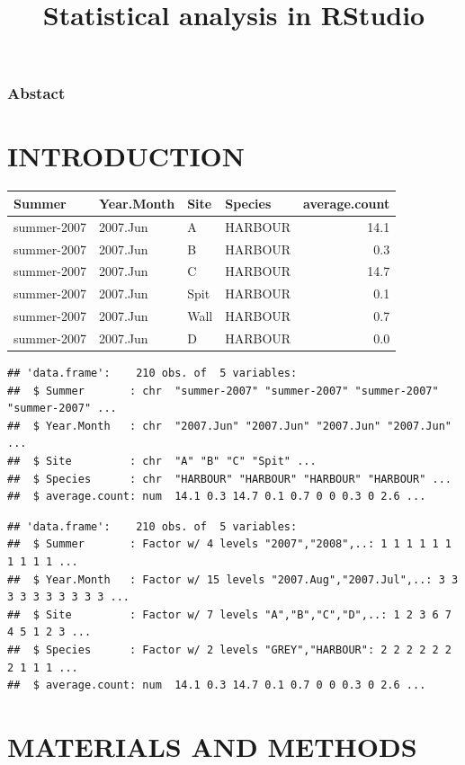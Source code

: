 \documentclass[
]{article}
\title{Statistical analysis in RStudio}
\author{}
\date{\vspace{-2.5em}}
\begin{document}
\maketitle

{
\setcounter{tocdepth}{2}
\tableofcontents
}
\hypertarget{abstact}{%
\subsubsection{Abstact}\label{abstact}}

\hypertarget{introduction}{%
\section{INTRODUCTION}\label{introduction}}

\begin{longtable}[]{@{}llllr@{}}
\toprule
Summer & Year.Month & Site & Species & average.count\tabularnewline
\midrule
\endhead
summer-2007 & 2007.Jun & A & HARBOUR & 14.1\tabularnewline
summer-2007 & 2007.Jun & B & HARBOUR & 0.3\tabularnewline
summer-2007 & 2007.Jun & C & HARBOUR & 14.7\tabularnewline
summer-2007 & 2007.Jun & Spit & HARBOUR & 0.1\tabularnewline
summer-2007 & 2007.Jun & Wall & HARBOUR & 0.7\tabularnewline
summer-2007 & 2007.Jun & D & HARBOUR & 0.0\tabularnewline
\bottomrule
\end{longtable}

\begin{verbatim}
## 'data.frame':    210 obs. of  5 variables:
##  $ Summer       : chr  "summer-2007" "summer-2007" "summer-2007" "summer-2007" ...
##  $ Year.Month   : chr  "2007.Jun" "2007.Jun" "2007.Jun" "2007.Jun" ...
##  $ Site         : chr  "A" "B" "C" "Spit" ...
##  $ Species      : chr  "HARBOUR" "HARBOUR" "HARBOUR" "HARBOUR" ...
##  $ average.count: num  14.1 0.3 14.7 0.1 0.7 0 0 0.3 0 2.6 ...
\end{verbatim}

\begin{verbatim}
## 'data.frame':    210 obs. of  5 variables:
##  $ Summer       : Factor w/ 4 levels "2007","2008",..: 1 1 1 1 1 1 1 1 1 1 ...
##  $ Year.Month   : Factor w/ 15 levels "2007.Aug","2007.Jul",..: 3 3 3 3 3 3 3 3 3 3 ...
##  $ Site         : Factor w/ 7 levels "A","B","C","D",..: 1 2 3 6 7 4 5 1 2 3 ...
##  $ Species      : Factor w/ 2 levels "GREY","HARBOUR": 2 2 2 2 2 2 2 1 1 1 ...
##  $ average.count: num  14.1 0.3 14.7 0.1 0.7 0 0 0.3 0 2.6 ...
\end{verbatim}

\hypertarget{materials-and-methods}{%
\section{MATERIALS AND METHODS}\label{materials-and-methods}}
\end{document}
